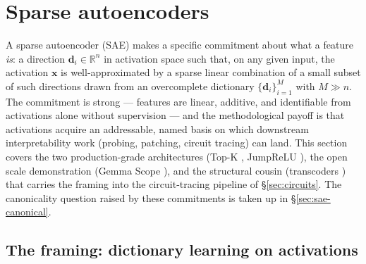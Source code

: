 
\section{Sparse autoencoders}
\label{sec:sparse-autoencoders}

A sparse autoencoder (SAE) makes a specific commitment about what a
feature \emph{is}: a direction $\mathbf{d}_i \in \mathbb{R}^n$ in
activation space such that, on any given input, the activation
$\mathbf{x}$ is well-approximated by a sparse linear combination of a
small subset of such directions drawn from an overcomplete dictionary
$\{\mathbf{d}_i\}_{i=1}^M$ with $M \gg n$. The commitment is strong —
features are linear, additive, and identifiable from activations alone
without supervision — and the methodological payoff is that activations
acquire an addressable, named basis on which downstream interpretability
work (probing, patching, circuit tracing) can land. This section covers
the two production-grade architectures (Top-K \citep{gao2024-topk-saes},
JumpReLU \citep{rajamanoharan2024-jumprelu}), the open scale
demonstration (Gemma Scope \citep{gemma-scope-2024}), and the structural
cousin (transcoders \citep{dunefsky2024-transcoders}) that carries the
framing into the circuit-tracing pipeline of \S\ref{sec:circuits}. The
canonicality question raised by these commitments is taken up in
\S\ref{sec:sae-canonical}.

\subsection{The framing: dictionary learning on activations}
\label{sec:sae-framing}

